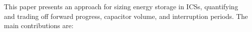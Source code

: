 This paper presents an approach for sizing energy storage in ICSs, quantifying and trading off forward progress, capacitor volume, and interruption periods. The main contributions are:




